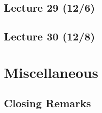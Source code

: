 \documentclass{book}
\theoremstyle{plain}
\begin{document}
    \chapter{Lecture 29 (12/6)}

    \chapter{Lecture 30 (12/8)}

  \part{Miscellaneous}
    \chapter{Closing Remarks}


  
\end{document}
